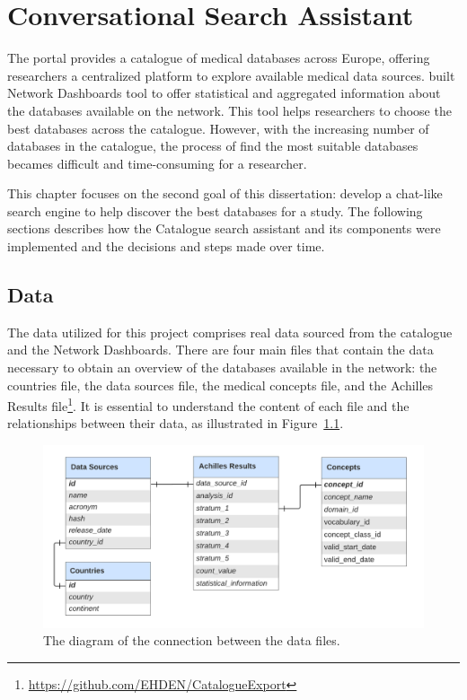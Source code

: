 \chapter{Conversational Search Assistant}
\label{chapter:CSA}


The {\ehden} portal provides a catalogue of medical databases across Europe, offering researchers a centralized platform to explore available medical data sources. {\ehden} built Network Dashboards tool to offer statistical and aggregated information about the databases available on the network. This tool helps researchers to choose the best databases across the catalogue. However, with the increasing number of databases in the catalogue, the process of find the most suitable databases becames difficult and time-consuming for a researcher.

This chapter focuses on the second goal of this dissertation: develop a chat-like search engine to help discover the best databases for a study. The following sections describes how the {\ehden} Catalogue search assistant and its components were implemented and the decisions and steps made over time.


\section{Data}
\label{data}

The data utilized for this project comprises real {\ehden} data sourced from the catalogue and the Network Dashboards. There are four main files that contain the data necessary to obtain an overview of the databases available in the {\ehden} network: the countries file, the data sources file, the medical concepts file, and the Achilles Results file\footnote{\url{https://github.com/EHDEN/CatalogueExport}}. It is essential to understand the content of each file and the relationships between their data, as illustrated in Figure~\ref{fig_data_diagram}.

\begin{figure}[H]
    \includegraphics[width=1\textwidth]{figs/chapter3/data_diagram.png}
    \centering
    \caption[The diagram of the connection between the data files]{The diagram of the connection between the data files.}
    \label{fig_data_diagram}
\end{figure}


